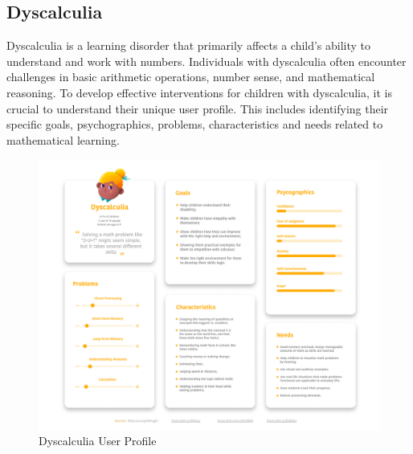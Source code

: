 \subsection{Dyscalculia}

Dyscalculia is a learning disorder that primarily affects a child's ability to understand and work with numbers. Individuals with dyscalculia often encounter challenges in basic arithmetic operations, number sense, and mathematical reasoning. To develop effective interventions for children with dyscalculia, it is crucial to understand their unique user profile. This includes identifying their specific goals, psychographics, problems, characteristics and needs related to mathematical learning.

\begin{figure}[H]
    \centering
    \includegraphics[width=0.8\linewidth]{Chapters/figma/Discalculia.png}
    \caption{Dyscalculia User Profile}
    \label{fig:dyscalculiaUserProfile}
\end{figure}

